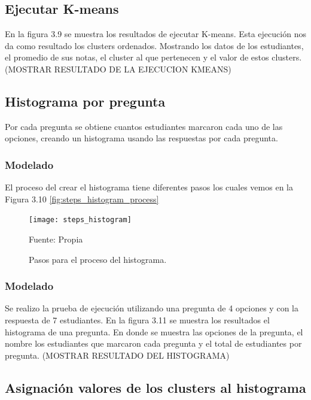 \subsection{Ejecutar K-means}

En la figura 3.9 se muestra los resultados de ejecutar K-means. Esta ejecución nos da como resultado los clusters ordenados. Mostrando los datos de los estudiantes, el promedio de sus notas, el cluster al que pertenecen y el valor de estos clusters.
(MOSTRAR RESULTADO DE LA EJECUCION KMEANS)

\subsection{Histograma por pregunta}

Por cada pregunta se obtiene cuantos estudiantes marcaron cada uno de las opciones, creando un histograma usando las respuestas por cada pregunta.

\subsubsection{Modelado}

El proceso del crear el histograma tiene diferentes pasos los cuales vemos en la Figura 3.10 \ref{fig:steps_histogram_process}

\begin{figure}[ht]
	\begin{center}
		\texttt{[image: steps\_histogram]}
	\end{center}
	\begin{center}
		\vskip -0.5cm
		\caption{\small{Pasos para el proceso del histograma.}}
		{\small{Fuente: Propia}}
	\end{center}
\end{figure}

\subsubsection{Modelado}

Se realizo la prueba de ejecución utilizando una pregunta de 4 opciones y con la respuesta de 7 estudiantes. En la figura 3.11 se muestra los resultados el histograma de una pregunta. En donde se muestra las opciones de la pregunta, el nombre los estudiantes que marcaron cada pregunta y el total de estudiantes por pregunta.
(MOSTRAR RESULTADO DEL HISTOGRAMA)

\subsection{Asignación valores de los clusters al histograma}

